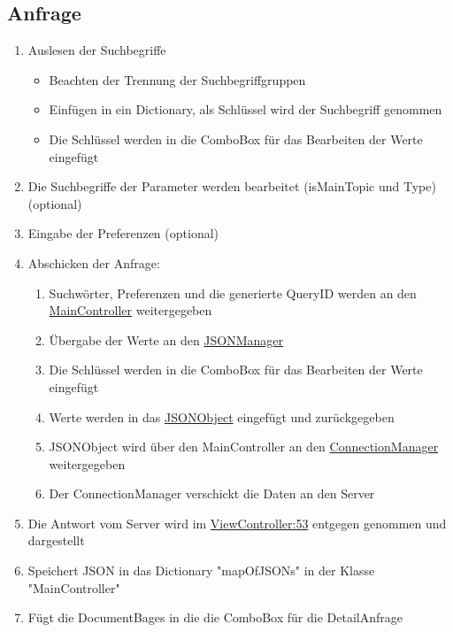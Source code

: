 \documentclass[a4paper,10pt]{article}
\begin{document}
\subsection{Anfrage}
\begin{enumerate}
  \item Auslesen der Suchbegriffe
    \begin{itemize}
      \item Beachten der Trennung der Suchbegriffgruppen
      \item Einfügen in ein Dictionary, als Schlüssel wird der Suchbegriff genommen
      \item Die Schlüssel werden in die ComboBox für das Bearbeiten der Werte eingefügt
    \end{itemize}
  \item Die Suchbegriffe der Parameter werden bearbeitet (isMainTopic und Type) (optional)
  \item Eingabe der Preferenzen (optional)
  \item Abschicken der Anfrage:
    \begin{enumerate}
      \item Suchwörter, Preferenzen und die generierte QueryID werden an den \href{https://github.com/SECH-Tag-EEXCESS-Browser/iOSX-App/blob/master/Team%20Content/Demos/JSON/Sech/Sech/MainController.swift}{MainController} weitergegeben
      \item Übergabe der Werte an den \href{https://github.com/SECH-Tag-EEXCESS-Browser/iOSX-App/blob/master/Team%20Content/Demos/JSON/Sech/Sech/JSONManager.swift}{JSONManager}
      \item Die Schlüssel werden in die ComboBox für das Bearbeiten der Werte eingefügt
      \item Werte werden in das \href{https://github.com/SECH-Tag-EEXCESS-Browser/iOSX-App/blob/master/Team%20Content/Demos/JSON/Sech/Sech/Json.swift}{JSONObject} eingefügt und zurückgegeben
      \item JSONObject wird über den MainController an den \href{https://github.com/SECH-Tag-EEXCESS-Browser/iOSX-App/blob/master/Team%20Content/Demos/JSON/Sech/Sech/ConnectionManager.swift}{ConnectionManager} weitergegeben
      \item Der ConnectionManager verschickt die Daten an den Server
    \end{enumerate}
  \item Die Antwort vom Server wird im \href{https://github.com/SECH-Tag-EEXCESS-Browser/iOSX-App/blob/master/Team%20Content/Demos/JSON/Sech/Sech/ViewController.swift}{ViewController:53} entgegen genommen und dargestellt
  \item Speichert JSON in das Dictionary "mapOfJSONs" in der Klasse "MainController"
  \item Fügt die DocumentBages in die die ComboBox für die DetailAnfrage
\end{enumerate}
\pagebreak
\end{document}
